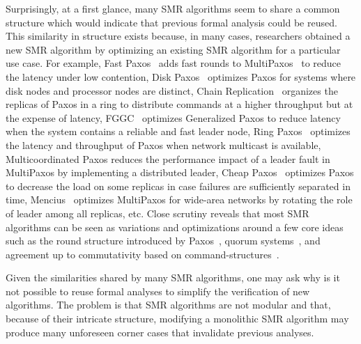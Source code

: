 Surprisingly, at a first glance, many SMR algorithms seem to share a common
structure which would indicate that previous formal analysis could be reused.
This similarity in structure exists because, in many cases, researchers obtained
a new SMR algorithm by optimizing an existing SMR algorithm for a particular use
case. For example, Fast Paxos~\cite{Lamport06FastPaxos} adds fast rounds
to MultiPaxos~\cite{lamport2001paxos} to reduce the latency under low
contention, Disk Paxos~\cite{GafniLamport03DiskPaxos} optimizes Paxos
for systems where disk nodes and processor nodes are distinct, Chain
Replication~\cite{RenesseSchneider04ChainReplicationSupportingHighThroughputAvailability} 
organizes the replicas of Paxos in a ring to distribute
commands at a higher throughput but at the expense of latency,
FGGC~\cite{SutraShapiro11FastGenuineGeneralizedConsensus} optimizes
Generalized Paxos\cite{Lamport05GeneralizeConsensus} to reduce latency
when the system contains a reliable and fast leader node, Ring
Paxos~\cite{MarandiETAL10RingPaxosHighthroughputAtomicBroadcastProtocol}
optimizes the latency and throughput of Paxos when network multicast is
available, Multicoordinated Paxos reduces the performance impact of a
leader fault in MultiPaxos by implementing a distributed leader, Cheap
Paxos~\cite{LamportMassa04CheapPaxos} optimizes Paxos to decrease the load
on some replicas in case failures are sufficiently separated in time,
Mencius~\cite{MaoJunqueiraMarzullo08MenciusBuildingEfficientReplicatedStateMachine} 
optimizes MultiPaxos for wide-area networks by rotating the role of leader
among all replicas, etc. Close scrutiny reveals that most SMR algorithms can
be seen as variations and optimizations around a few core ideas such as the
round structure introduced by Paxos~\cite{Lamport98ParttimeParliament}, quorum
systems~\cite{GuerraouiVukolic10RefinedQuorumSystems,Lamport06FastPaxos},
and agreement up to commutativity based on command-structures~\cite{Lamport05GeneralizeConsensus}.

Given the similarities shared by many SMR algorithms, one may ask why is it
not possible to reuse formal analyses to simplify the verification of new
algorithms. The problem is that SMR algorithms are not modular and that, because
of their intricate structure, modifying a monolithic SMR algorithm may produce
many unforeseen corner cases that invalidate previous analyses.

